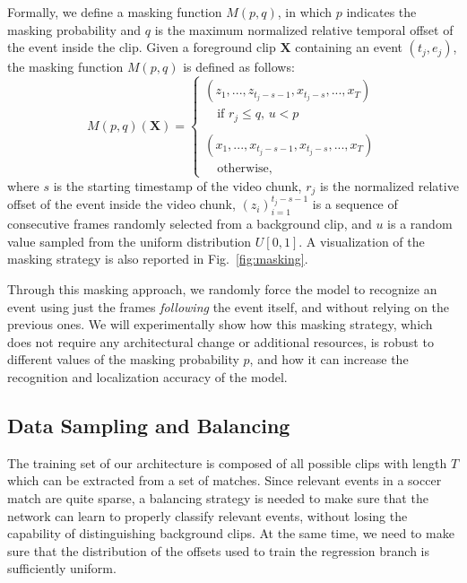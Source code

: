 \documentclass[a4paper,conference]{IEEEtran}
\begin{document}
Formally, we define a masking function $M(p,q)$, in which $p$ indicates the masking probability and $q$ is the maximum normalized relative temporal offset of the event inside the clip. Given a foreground clip $\bm{X}$ containing an event $(t_j, e_j)$, the masking function $M(p,q)$ is defined as follows:
\begin{equation}
\label{eq:masking}
M(p,q)(\bm{X}) = 
\begin{cases}
    \left(z_{1}, ..., z_{t_j-s-1}, x_{t_j-s}, ..., x_T\right) \\ \quad \text{if } r_j \leq q \text{, } u<p\\ \\
    \left(x_{1}, ..., x_{t_j-s-1}, x_{t_j-s}, ..., x_T\right) \\ \quad \text{otherwise},
\end{cases}
\end{equation}
where $s$ is the starting timestamp of the video chunk, $r_j$ is the normalized relative offset of the event inside the video chunk, $(z_i)_{i=1}^{t_j-s-1}$ is a sequence of consecutive frames randomly selected from a background clip, and $u$ is a random value sampled from the uniform distribution $U \left[0,1\right]$. A visualization of the masking strategy is also reported in Fig.~\ref{fig:masking}.

Through this masking approach, we randomly force the model to recognize an event using just the frames \textit{following} the event itself, and without relying on the previous ones. We will experimentally show how this masking strategy, which does not require any architectural change or additional resources, is robust to different values of the masking probability $p$, and how it can increase the recognition and localization accuracy of the model. 

\subsection{Data Sampling and Balancing}
\label{sub:augm}
The training set of our architecture is composed of all possible clips with length $T$ which can be extracted from a set of matches. Since relevant events in a soccer match are quite sparse, a balancing strategy is needed to make sure that the network can learn to properly classify relevant events, without losing the capability of distinguishing background clips. At the same time, we need to make sure that the distribution of the offsets used to train the regression branch is sufficiently uniform.
\end{document}
